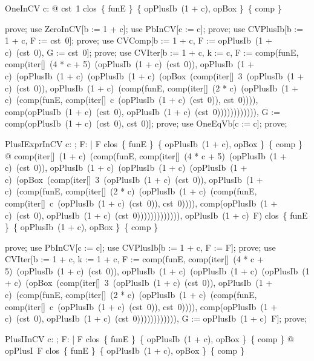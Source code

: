 \documentclass{article}
\begin{document}
\begin{theorem}{OneInCV}
  \forall c: \nat @ cst~1 \in clos~\{ funE \}~\{ opPlusIb~(1 + c), opBox \}~\{ comp \}
\end{theorem}

\begin{zproof}
prove;
use ZeroInCV[b := 1 + c];
use PbInCV[c := c];
prove;
use CVPlusIb[b := 1 + c, F := cst~0];
prove;
use CVComp[b := 1 + c, F := opPlusIb~(1 + c)~(cst~0), G := cst~0];
prove;
use CVIter[b := 1 + c, k := c, F := comp(funE, comp(iter[\nat]~(4 * c + 5)~(opPlusIb~(1 + c)~(cst~0)), opPlusIb~(1 + c)~(opPlusIb~(1 + c)~(opPlusIb~(1 + c)~(opBox~(comp(iter[\nat]~3~(opPlusIb~(1 + c)~(cst~0)), opPlusIb~(1 + c)~(comp(funE, comp(iter[\nat]~(2 * c)~(opPlusIb~(1 + c)~(comp(funE, comp(iter[\nat]~c~(opPlusIb~(1 + c)~(cst~0)), cst~0)))), comp(opPlusIb~(1 + c)~(cst~0), opPlusIb~(1 + c)~(cst~0)))))))))))), G := comp(opPlusIb~(1 + c)~(cst~0), cst~0)];
prove;
use OneEqVb[c := c];
prove;
\end{zproof}

\begin{theorem}{PlusIExprInCV}
  \forall c: \nat; F: \nat \fun \nat | F \in clos~\{ funE \}~\{ opPlusIb~(1 + c), opBox \}~\{ comp \} @ comp(iter[\nat]~(1 + c)~(comp(funE, comp(iter[\nat]~(4 * c + 5)~(opPlusIb~(1 + c)~(cst~0)), opPlusIb~(1 + c)~(opPlusIb~(1 + c)~(opPlusIb~(1 + c)~(opBox~(comp(iter[\nat]~3~(opPlusIb~(1 + c)~(cst~0)), opPlusIb~(1 + c)~(comp(funE, comp(iter[\nat]~(2 * c)~(opPlusIb~(1 + c)~(comp(funE, comp(iter[\nat]~c~(opPlusIb~(1 + c)~(cst~0)), cst~0)))), comp(opPlusIb~(1 + c)~(cst~0), opPlusIb~(1 + c)~(cst~0))))))))))))), opPlusIb~(1 + c)~F) \in clos~\{ funE \}~\{ opPlusIb~(1 + c), opBox \}~\{ comp \}
\end{theorem}

\begin{zproof}
prove;
use PbInCV[c := c];
use CVPlusIb[b := 1 + c, F := F];
prove;
use CVIter[b := 1 + c, k := 1 + c, F := comp(funE, comp(iter[\nat]~(4 * c + 5)~(opPlusIb~(1 + c)~(cst~0)), opPlusIb~(1 + c)~(opPlusIb~(1 + c)~(opPlusIb~(1 + c)~(opBox~(comp(iter[\nat]~3~(opPlusIb~(1 + c)~(cst~0)), opPlusIb~(1 + c)~(comp(funE, comp(iter[\nat]~(2 * c)~(opPlusIb~(1 + c)~(comp(funE, comp(iter[\nat]~c~(opPlusIb~(1 + c)~(cst~0)), cst~0)))), comp(opPlusIb~(1 + c)~(cst~0), opPlusIb~(1 + c)~(cst~0)))))))))))), G := opPlusIb~(1 + c)~F];
prove;
\end{zproof}

\begin{theorem}{PlusIInCV}
  \forall c: \nat; F: \nat \fun \nat | F \in clos~\{ funE \}~\{ opPlusIb~(1 + c), opBox \}~\{ comp \} @ opPlusI~F \in clos~\{ funE \}~\{ opPlusIb~(1 + c), opBox \}~\{ comp \}
\end{theorem}
\end{document}
